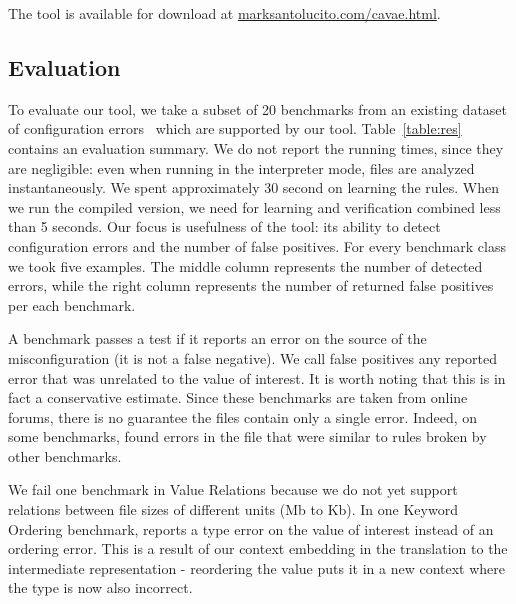 The tool is available for download at \url{marksantolucito.com/cavae.html}.


\subsection{Evaluation}

To evaluate our tool, we take a subset of 20 benchmarks from an
existing dataset of configuration errors~\cite{yin11anempirical,xu15hey,configdataset} which are supported by our tool. Table~\ref{table:res} contains an evaluation summary.
We do not report the running times, since they are negligible: even when
 running in the interpreter mode, files are analyzed instantaneously. We
spent approximately 30 second on learning the rules. When we run the
compiled version, we need for learning and verification 
combined less than 5 seconds. Our focus is usefulness of the tool: its 
 ability to detect configuration errors and the number of false positives.
 For every benchmark class we took five examples. The middle column represents the number of detected errors, while the right column represents the number of returned false positives per each benchmark.
 


\iffalse{
We take the subset of benchmarks for which our tool has implemented rule modules.
Although our tool is general and extensible, we have only implemented four types of rules over the MySQL configuration language.
It would not make sense to run \app on misconfigurations for which there are no rule modules.}
\fi

A benchmark passes a test if it reports an error on the source of the misconfiguration (it is not a false negative).
We call false positives any reported error that was unrelated to the value of interest.
It is worth noting that this is in fact a conservative estimate.
Since these benchmarks are taken from online forums, there is no guarantee the files contain only a single error.
Indeed, on some benchmarks, \app found errors in the file that were similar to rules broken by other benchmarks. 

We fail one benchmark in Value Relations because we do not yet support relations between file sizes of different units (Mb to Kb).
In one Keyword Ordering benchmark, \app reports a type error on the value of interest instead of an ordering error.
This is a result of our context embedding in the translation to the intermediate representation - reordering the value puts it in a new context where the type is now also incorrect.

